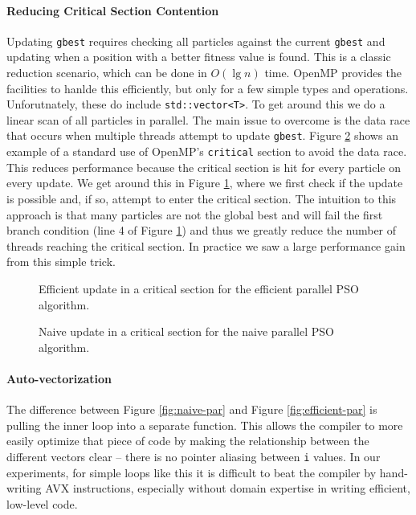 \paragraph{Reducing Critical Section Contention} Updating \texttt{gbest}
requires checking all particles against the current \texttt{gbest} and updating
when a position with a better fitness value is found. This is a classic
reduction scenario, which can be done in $O(\lg n)$ time. OpenMP provides the
facilities to hanlde this efficiently, but only for a few simple types and
operations. Unforutnately, these do include \texttt{std::vector<T>}. To get
around this we do a linear scan of all particles in parallel. The main issue
to overcome is the data race that occurs when multiple threads attempt to
update \texttt{gbest}. Figure \ref{fig:naive-update} shows an example of a
standard use of OpenMP's \texttt{critical} section to avoid the data race. This
reduces performance because the critical section is hit for every particle on
every update. We get around this in Figure \ref{fig:efficient-update}, where we
first check if the update is possible and, if so, attempt to enter the critical
section. The intuition to this approach is that many particles are not the
global best and will fail the first branch condition (line 4 of Figure
\ref{fig:efficient-update}) and thus we greatly reduce the number of threads
reaching the critical section. In practice we saw a large performance gain from
this simple trick.

\begin{figure}
  
  \caption{Efficient update in a critical section for the efficient parallel PSO
    algorithm.}
  \label{fig:efficient-update}
\end{figure}

\begin{figure}
  
  \caption{Naive update in a critical section for the naive parallel PSO
    algorithm.}
  \label{fig:naive-update}
\end{figure}

\paragraph{Auto-vectorization}
The difference between Figure \ref{fig:naive-par} and Figure
\ref{fig:efficient-par} is pulling the inner loop into a separate function. This
allows the compiler to more easily optimize that piece of code by making the
relationship between the different vectors clear -- there is no pointer aliasing
between \texttt{i} values. In our experiments, for simple loops like this it is
difficult to beat the compiler by hand-writing AVX instructions, especially
without domain expertise in writing efficient, low-level code.

